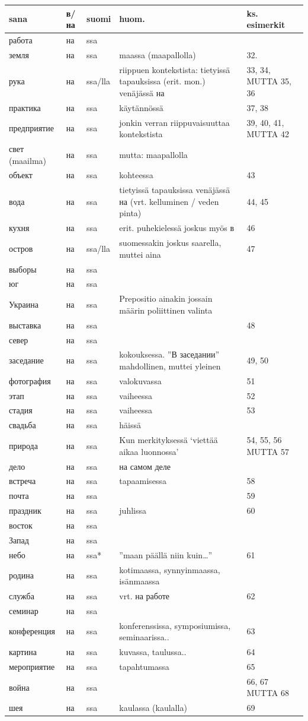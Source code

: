 \documentclass[]{scrreprt}
\begin{document}
\begin{longtable}[c]{@{}lllp{5cm}p{3cm}@{}}
\toprule
sana & в/на & suomi & huom. & ks. esimerkit\tabularnewline
\midrule
\endhead
работа & на & ssa & &\tabularnewline
земля & на & ssa & maassa (maapallolla) & 32.\tabularnewline
рука & на & ssa/lla & riippuen kontekstista: tietyissä tapauksissa
(erit. mon.) venäjässä на & 33, 34, MUTTA 35, 36\tabularnewline
практика & на & ssa & käytännössä & 37, 38\tabularnewline
предприятие & на & ssa & jonkin verran riippuvaisuuttaa kontekstista &
39, 40, 41, MUTTA 42\tabularnewline
свет (maailma) & на & ssa & mutta: maapallolla &\tabularnewline
объект & на & ssa & kohteessa & 43\tabularnewline
вода & на & ssa & tietyissä tapauksissa venäjässä на (vrt. kelluminen /
veden pinta) & 44, 45\tabularnewline
кухня & на & ssa & erit. puhekielessä joskus myös в & 46\tabularnewline
остров & на & ssa/lla & suomessakin joskus saarella, muttei aina &
47\tabularnewline
выборы & на & ssa & &\tabularnewline
юг & на & ssa & &\tabularnewline
Украина & на & ssa & Prepositio ainakin jossain määrin poliittinen
valinta &\tabularnewline
выставка & на & ssa & & 48\tabularnewline
север & на & ssa & &\tabularnewline
заседание & на & ssa & kokouksessa. ''В заседании'' mahdollinen, muttei
yleinen & 49, 50\tabularnewline
фотография & на & ssa & valokuvassa & 51\tabularnewline
этап & на & ssa & vaiheessa & 52\tabularnewline
стадия & на & ssa & vaiheessa & 53\tabularnewline
свадьба & на & ssa & häissä &\tabularnewline
природа & на & ssa & Kun merkityksessä `viettää aikaa luonnossa' & 54,
55, 56 MUTTA 57\tabularnewline
дело & на & ssa & на самом деле &\tabularnewline
встреча & на & ssa & tapaamisessa & 58\tabularnewline
почта & на & ssa & & 59\tabularnewline
праздник & на & ssa & juhlissa & 60\tabularnewline
восток & на & ssa & &\tabularnewline
Запад & на & ssa & &\tabularnewline
небо & на & ssa* & ''maan päällä niin kuin\ldots{}'' & 61\tabularnewline
родина & на & ssa & kotimaassa, synnyinmaassa, isänmaassa
&\tabularnewline
служба & на & ssa & vrt. на работе & 62\tabularnewline
семинар & на & ssa & &\tabularnewline
конференция & на & ssa & konferenssissa, symposiumissa, seminaarissa.. &
63\tabularnewline
картина & на & ssa & kuvassa, taulussa.. & 64\tabularnewline
мероприятие & на & ssa & tapahtumassa & 65\tabularnewline
война & на & ssa & & 66, 67 MUTTA 68\tabularnewline
шея & на & ssa & kaulassa (kaulalla) & 69\tabularnewline
\bottomrule
\end{longtable}
\end{document}
